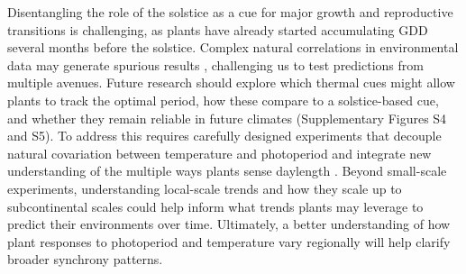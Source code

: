 \documentclass[11pt,letter]{article}
\begin{document}
Disentangling the role of the solstice as a cue for major growth and reproductive transitions is challenging, as plants have already started accumulating GDD several months before the solstice.
Complex natural correlations in environmental data may generate spurious results \citep[e.g.][]{Gao2024}, challenging us to test predictions from multiple avenues. %
Future research should explore which thermal cues might allow plants to track the optimal period, how these compare to a solstice-based cue, and whether they remain reliable in future climates (Supplementary Figures S4 and S5).
To address this requires carefully designed experiments that decouple natural covariation between temperature and photoperiod  \citep{Buonaiuto2023} and integrate new understanding of the multiple ways plants sense daylength \citep{wang2024plants}.  
Beyond small-scale experiments, understanding local-scale trends and how they scale up to subcontinental scales could help inform what trends plants may leverage to predict their environments over time. 
Ultimately, a better understanding of how plant responses to photoperiod and temperature vary regionally will help clarify broader synchrony patterns.
\end{document}
